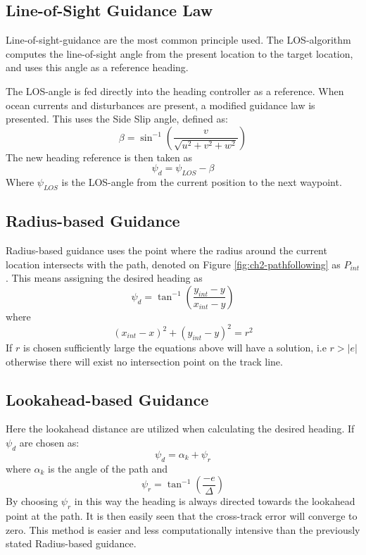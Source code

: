 	
	\subsection{Line-of-Sight Guidance Law}
	        Line-of-sight-guidance are the most common principle used. The LOS-algorithm computes
		the line-of-sight angle from the present location to the target location, and uses this
		angle as a reference heading.

		The LOS-angle is fed directly into the 
		heading controller as a reference. When ocean currents and disturbances are present, a
		modified guidance law is presented. This uses the Side Slip angle, defined as:
		\begin{equation}
			\label{eq:ch2-sideslip}
			\beta = \sin^{-1} ( \frac{v}{\sqrt{u^2 + v^2 + w^2}})
		\end{equation}
		The new heading reference is then taken as
		\begin{equation}
			\label{eq:ch2-los-law}
			\psi_d = \psi_{LOS} - \beta
		\end{equation}
		Where $\psi_{LOS}$ is the LOS-angle from the current position to the next waypoint. 

	\subsection{Radius-based Guidance}
		Radius-based guidance uses the point where the radius around the current location intersects
		with the path, denoted on Figure \ref{fig:ch2-pathfollowing} as $P_{int}$. This
		means assigning the desired heading as 
		\begin{equation}
			\psi_d = \tan^{-1}(\frac{y_{int} - y}{x_{int} - y})
		\end{equation}
		where 
		\begin{equation}
			(x_{int} - x)^2 + (y_{int} - y)^2 = r^2
		\end{equation}
		If $r$ is chosen sufficiently large the equations above will have a solution, i.e $r > |e|$
		otherwise there will exist no intersection point on the track line.
		\cite{guidance_planar_path}
	
	\subsection{Lookahead-based Guidance}
		Here the lookahead distance are utilized when calculating the desired heading. If $\psi_d$ are
		chosen as:
		\begin{equation}
			\psi_d = \alpha_k + \psi_r
		\end{equation}
		where $\alpha_k$ is the angle of the path and
		\begin{equation}
			\psi_r = \tan^{-1} (\frac{-e}{\Delta})
		\end{equation}
		By choosing $\psi_r$ in this way the heading is always directed towards the lookahead point at
		the path. It is then easily seen that the cross-track error will converge to zero. This
		method is easier and less computationally intensive than the previously stated Radius-based
		guidance. \cite{guidance_planar_path}

